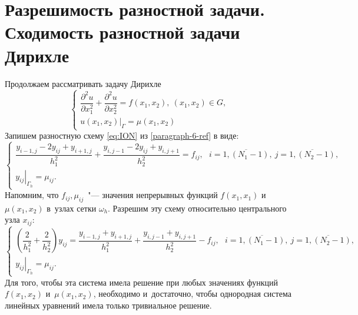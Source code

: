 \documentclass[11pt,a4paper,twoside,listtotoc,bibtotoc]{report}
\numberwithin{equation}{section}
\theoremstyle{definition}
\theoremstyle{plain}
\begin{document}
\section{Разрешимость разностной задачи. Сходимость разностной задачи Дирихле}
%
Продолжаем рассматривать задачу Дирихле
%
\begin{equation}
    \label{dirihle_eq_7}
    \begin{cases}
        \dfrac{\partial^2u}{\partial x_1^2} + \dfrac{\partial^2u}{\partial x_2^2}
            = f(x_1, x_2),~(x_1, x_2) \in G,\\[.2em]
        \left.u(x_1, x_2)\right\vert_{\Gamma} = \mu(x_1, x_2) &
    \end{cases}
\end{equation}
%
Запишем разностную схему \eqref{eq:ION} из \ref{paragraph-6-ref} в виде:
%
$$
    \begin{cases}
        \dfrac{y_{i-1,j} - 2y_{ij} + y_{i+1,j}}{h_1^2} +
        \dfrac{y_{i,j-1} - 2y_{ij} + y_{i,j+1}}{h_2^2} = f_{ij},~~~
        i=\overline{1,(N_1-1)},~j=\overline{1,(N_2-1)},\\
        \left.y_{ij}\right\vert_{\Gamma_h}=\mu_{ij}.
    \end{cases}
$$
%
Напомним, что $f_{ij}, \mu_{ij}$~"--- значения непрерывных функций
$f(x_1, x_1)$ и $\mu(x_1,x_2)$ в~узлах сетки $\omega_h$.
Разрешим эту схему относительно центрального узла $x_{ij}$:
%
\begin{equation}
    \label{dirichet-first}
    \begin{cases}
        \left(\dfrac{2}{h_1^2} + \dfrac{2}{h_2^2}\right)y_{ij} =
            \dfrac{y_{i-1,j} + y_{i+1,j}}{h_1^2} +
            \dfrac{y_{i,j-1} + y_{i,j+1}}{h_2^2}-f_{ij},~~~
            i=\overline{1,(N_1-1)},~j=\overline{1,(N_2-1)},\\
        \left.y_{ij}\right\vert_{\Gamma_h}=\mu_{ij}.
    \end{cases}
\end{equation}
%
Для того, чтобы эта система имела решение при любых значениях функций
$f(x_1,x_2)$ и~$\mu(x_1,x_2)$, необходимо и~достаточно,
чтобы однородная система линейных уравнений имела только тривиальное решение.
\end{document}
